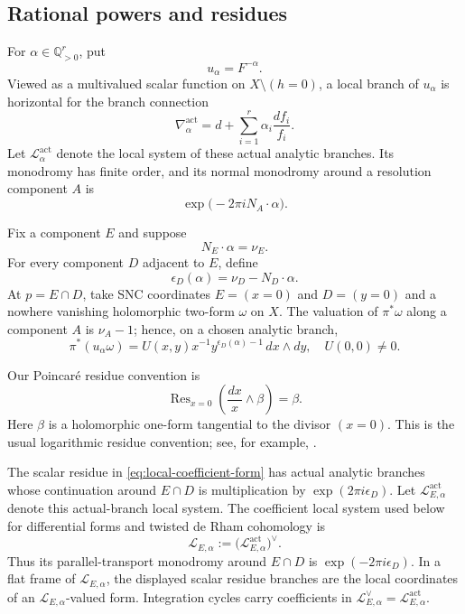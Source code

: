 \documentclass[12pt]{amsart}
\numberwithin{equation}{section}
\theoremstyle{plain}
\theoremstyle{definition}
\theoremstyle{remark}
\theoremstyle{definition}
\DeclareMathOperator{\Res}{Res}
\newcommand{\Q}{\mathbb Q}
\newcommand{\Lcal}{\mathscr L}
\begin{document}
\subsection{Rational powers and residues}

For $\alpha\in\Q_{>0}^r$, put
\[
 u_\alpha=F^{-\alpha}.
\]
Viewed as a multivalued scalar function on $X\setminus(h=0)$, a local branch of $u_\alpha$ is horizontal for the branch connection
\[
 \nabla_\alpha^{\mathrm{act}}
 =d+\sum_{i=1}^r\alpha_i\frac{df_i}{f_i}.
\]
Let $\Lcal_\alpha^{\mathrm{act}}$ denote the local system of these actual analytic branches. Its monodromy has finite order, and its normal monodromy around a resolution component $A$ is
\[
 \exp\bigl(-2\pi iN_A\cdot\alpha\bigr).
\]

Fix a component $E$ and suppose
\[
 N_E\cdot\alpha=\nu_E.
\]
For every component $D$ adjacent to $E$, define
\begin{equation}\label{eq:epsilon}
 \epsilon_D(\alpha)=\nu_D-N_D\cdot\alpha.
\end{equation}
At $p=E\cap D$, take SNC coordinates $E=(x=0)$ and $D=(y=0)$ and a nowhere vanishing holomorphic two-form $\omega$ on $X$. The valuation of $\pi^*\omega$ along a component $A$ is $\nu_A-1$; hence, on a chosen analytic branch,
\begin{equation}\label{eq:local-coefficient-form}
 \pi^*(u_\alpha\omega) = U(x,y)x^{-1}y^{\epsilon_D(\alpha)-1}\,dx\wedge dy,
 \quad U(0,0)\ne0.
\end{equation}

Our Poincar\'e residue convention is
\begin{equation}\label{eq:residue-convention}
 \Res_{x=0}\left(\frac{dx}{x}\wedge\beta\right)=\beta.
\end{equation}
Here $\beta$ is a holomorphic one-form tangential to the divisor $(x=0)$. This is the usual logarithmic residue convention; see, for example, \cite[Chapitre~II]{Deligne1970}.

The scalar residue in \eqref{eq:local-coefficient-form} has actual analytic branches whose continuation around $E\cap D$ is multiplication by $\exp(2\pi i\epsilon_D)$. Let $\Lcal_{E,\alpha}^{\mathrm{act}}$ denote this actual-branch local system. The coefficient local system used below for differential forms and twisted de Rham cohomology is
\[
 \Lcal_{E,\alpha}
 :=\bigl(\Lcal_{E,\alpha}^{\mathrm{act}}\bigr)^\vee.
\]
Thus its parallel-transport monodromy around $E\cap D$ is $\exp(-2\pi i\epsilon_D)$. In a flat frame of $\Lcal_{E,\alpha}$, the displayed scalar residue branches are the local coordinates of an $\Lcal_{E,\alpha}$-valued form. Integration cycles carry coefficients in $\Lcal_{E,\alpha}^\vee=\Lcal_{E,\alpha}^{\mathrm{act}}$.
\end{document}

